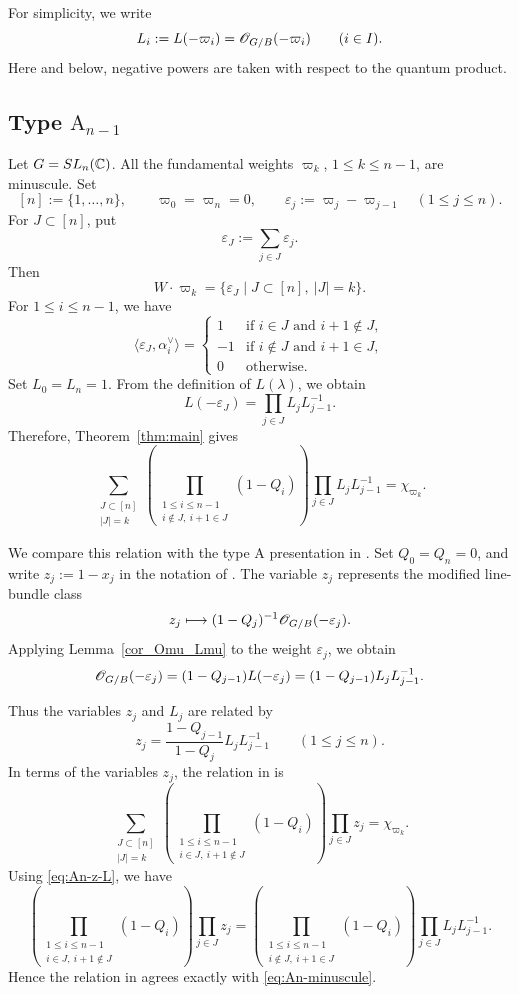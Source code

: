 \documentclass{amsart}
\numberwithin{equation}{section}
\begin{document}
 For simplicity, we write
\[
  L_i:=L(-\varpi_i)=\mathscr{O}_{G/B}(-\varpi_i)
  \qquad (i\in I).
\]
Here and below, negative powers are taken with respect to the quantum product.




\subsection{Type \(\mathrm A_{n-1}\)}

Let \(G=SL_n (\mathbb{C}) \). All the fundamental weights
\(\varpi_k\), \(1\leq k\leq n-1\), are minuscule. Set
\[
[n]:=\{1,\ldots,n\},\qquad
\varpi_0=\varpi_n=0,\qquad
\varepsilon_j:=\varpi_j-\varpi_{j-1}
\quad (1\leq j\leq n).
\]
For \(J\subset[n]\), put
\[
\varepsilon_J:=\sum_{j\in J}\varepsilon_j.
\]
Then
\[
W\cdot\varpi_k
=
\{\varepsilon_J\mid J\subset[n],\ |J|=k\}.
\]
For \(1\leq i\leq n-1\), we have
\[
\langle\varepsilon_J,\alpha_i^\vee\rangle
=
\begin{cases}
  1  & \text{if \(i\in J\) and \(i+1\notin J\)},\\
 -1  & \text{if \(i\notin J\) and \(i+1\in J\)},\\
  0  & \text{otherwise}.
\end{cases}
\]
Set \(L_0=L_n=1\). From the definition of \(L(\lambda)\), we obtain
\[
L(-\varepsilon_J)
=
\prod_{j\in J}L_jL_{j-1}^{-1}.
\]
Therefore, Theorem~\ref{thm:main} gives
\begin{equation}
\sum_{\substack{J\subset[n]\\ |J|=k}}
\left(
\prod_{\substack{1\leq i\leq n-1\\
i\notin J,\ i+1\in J}}
(1-Q_i)
\right)
\prod_{j\in J}L_jL_{j-1}^{-1}
=
\chi_{\varpi_k}.
\label{eq:An-minuscule}
\end{equation}

We compare this relation with the type \(\mathrm A\) presentation
in \cite{MNS1}. Set \(Q_0=Q_n=0\), and write
\(z_j:=1-x_j\) in the notation of \cite{MNS1}. The variable \(z_j\)
represents the modified line-bundle class
\[
z_j
\longmapsto
(1-Q_j)^{-1}\mathscr{O}_{G/B}(-\varepsilon_j).
\]
Applying Lemma~\ref{cor_Omu_Lmu} to the weight \(\varepsilon_j\), we obtain
\[
\mathscr{O}_{G/B}(-\varepsilon_j)
=
(1-Q_{j-1})L(-\varepsilon_j)
=
(1-Q_{j-1})L_jL_{j-1}^{-1}.
\]

    
Thus the variables \(z_j\) and \(L_j\) are related by
\begin{equation}
z_j
=
\frac{1-Q_{j-1}}{1-Q_j}
L_jL_{j-1}^{-1}
\qquad (1\leq j\leq n).
\label{eq:An-z-L}
\end{equation}
In terms of the variables \(z_j\), the relation in \cite{MNS1} is
\[
\sum_{\substack{J\subset[n]\\ |J|=k}}
\left(
\prod_{\substack{1\leq i\leq n-1\\
i\in J,\ i+1\notin J}}
(1-Q_i)
\right)
\prod_{j\in J}z_j
=
\chi_{\varpi_k}.
\]
Using \eqref{eq:An-z-L}, we have
\[
\left(
\prod_{\substack{1\leq i\leq n-1\\
i\in J,\ i+1\notin J}}
(1-Q_i)
\right)
\prod_{j\in J}z_j
=
\left(
\prod_{\substack{1\leq i\leq n-1\\
i\notin J,\ i+1\in J}}
(1-Q_i)
\right)
\prod_{j\in J}L_jL_{j-1}^{-1}.
\]
Hence the relation in \cite{MNS1} agrees exactly with
\eqref{eq:An-minuscule}.
\end{document}
